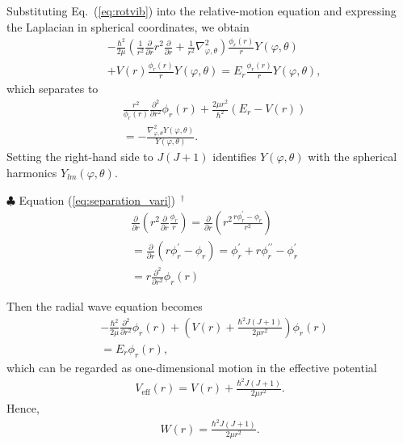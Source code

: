Substituting Eq.~(\ref{eq:rotvib}) into the relative-motion equation and expressing the Laplacian in spherical coordinates, we obtain
\begin{align}
&- \frac{\hbar^2}{2 \mu} \left( \frac{1}{r^2} \frac{\partial }{\partial r} r^2 \frac{\partial }{\partial r} + \frac{1}{r^2} \nabla^2_{\varphi,\theta} \right) \frac{\phi_r(r)}{r} Y(\varphi, \theta) \nonumber \\
&+ V(r) \frac{\phi_r(r)}{r} Y(\varphi, \theta) = E_r \frac{\phi_r(r)}{r} Y(\varphi, \theta),
\end{align}
which separates to
\begin{align}
\label{eq:separation_vari}
&\frac{r^2}{ \phi_r(r)}\frac{\partial^2}{\partial r^2} \phi_r(r) + \frac{2 \mu r^2}{\hbar^2} (E_r - V(r)) \nonumber \\
&= - \frac{\nabla^2_{\varphi,\theta} Y(\varphi,\theta)}{Y(\varphi,\theta)}.
\end{align}
Setting the right-hand side to $J(J+1)$ identifies $Y(\varphi,\theta)$ with the spherical harmonics $Y_{lm}(\varphi,\theta)$.


\begin{itembox}{$\clubsuit$ Equation (\ref{eq:separation_vari}) $\,^\dagger$}
\footnotesize
\begin{align}
  &\frac{\partial}{\partial r} \left(r^2 \frac{\partial}{\partial r} \frac{\phi_r}{r} \right)
  = \frac{\partial}{\partial r} \left( r^2 \frac{r \phi_r^\prime - \phi_r}{r^2}\right) \nonumber \\
  &= \frac{\partial}{\partial r} ( r \phi_r^\prime - \phi_r)
  = \phi_r^\prime + r \phi_r^{\prime\prime} - \phi_r^\prime \nonumber \\ 
  &= r \frac{\partial^2}{\partial r^2} \phi_r(r)
\end{align}
\end{itembox}

Then the radial wave equation becomes
\begin{align}
&- \frac{\hbar^2}{2 \mu} \frac{\partial^2}{\partial r^2} \phi_r(r)
+ \left(  V(r) + \frac{\hbar^2 J(J+1)}{2 \mu r^2} \right) \phi_r(r) \nonumber \\
&= E_r \phi_r(r),
\end{align}
which can be regarded as one-dimensional motion in the effective potential
\begin{align}
V_\mathrm{eff} (r) = V(r) + \frac{\hbar^2 J(J+1)}{2 \mu r^2}.
\end{align}
Hence,
\begin{align}
W(r) = \frac{\hbar^2 J(J+1)}{2 \mu r^2}.
\end{align}

